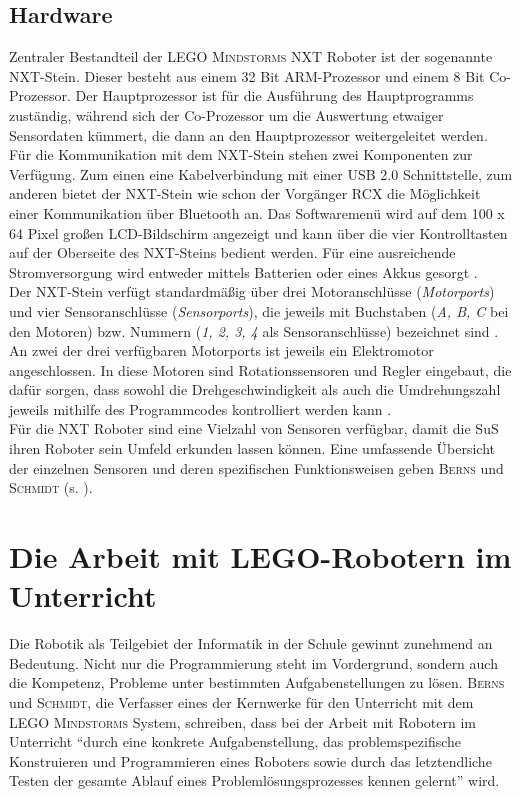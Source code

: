 \documentclass[paper=a4, pagesize, DIV=calc, BCOR=15.5mm, twoside=on, onecolumn=on, open = right, titlepage =on, parskip =half-, headsepline = on, footsepline = on, chapterprefix = on, appendixprefix = off, fontsize = 12pt, numbers = noenddot, abstract = on]{scrbook}
\numberwithin{equation}{chapter}
\theoremstyle{definition}
\theoremstyle{plain}
\theoremstyle{plain}
\theoremstyle{remark}
\theoremstyle{plain}
\theoremstyle{plain}
\begin{document}
\par \singlespacing
\subsection{Hardware}
\onehalfspacing
Zentraler Bestandteil der \textsc{LEGO Mindstorms} NXT Roboter ist der sogenannte NXT-Stein. Dieser besteht aus einem 32 Bit ARM-Prozessor und einem 8 Bit Co-Prozessor. Der Hauptprozessor ist für die Ausführung des Hauptprogramms zuständig, während sich der Co-Prozessor um die Auswertung etwaiger Sensordaten kümmert, die dann an den Hauptprozessor weitergeleitet werden. Für die Kommunikation mit dem NXT-Stein stehen zwei Komponenten zur Verfügung. Zum einen eine Kabelverbindung mit einer USB 2.0 Schnittstelle, zum anderen bietet der NXT-Stein wie schon der Vorgänger RCX die Möglichkeit einer Kommunikation über Bluetooth an. Das Softwaremenü wird auf dem 100 x 64 Pixel großen LCD-Bildschirm angezeigt und kann über die vier Kontrolltasten auf der Oberseite des NXT-Steins bedient werden. Für eine ausreichende Stromversorgung wird entweder mittels Batterien oder eines Akkus gesorgt \cite[S.42]{berns:10}.\\
Der NXT-Stein verfügt standardmäßig über drei Motoranschlüsse (\emph{Motorports}) und vier Sensoranschlüsse (\emph{Sensorports}), die jeweils mit Buchstaben (\emph{A, B, C} bei den Motoren) bzw. Nummern (\emph{1, 2, 3, 4} als Sensoranschlüsse) bezeichnet sind \cite[S.43]{berns:10}. An zwei der drei verfügbaren Motorports ist jeweils ein Elektromotor angeschlossen. In diese Motoren sind Rotationssensoren und Regler eingebaut, die dafür sorgen, dass sowohl die Drehgeschwindigkeit als auch die Umdrehungszahl jeweils mithilfe des Programmcodes kontrolliert werden kann \cite[S.45--47]{berns:10}.\\
Für die NXT Roboter sind eine Vielzahl von Sensoren verfügbar, damit die SuS ihren Roboter sein Umfeld erkunden lassen können. Eine umfassende Übersicht der einzelnen Sensoren und deren spezifischen Funktionsweisen geben \textsc{Berns} und \textsc{Schmidt} (s. \cite[Kapitel 4.2]{berns:10}). 

\par \singlespacing
 \section{Die Arbeit mit LEGO-Robotern im Unterricht}
\onehalfspacing
Die Robotik als Teilgebiet der Informatik in der Schule gewinnt zunehmend an Bedeutung. Nicht nur die Programmierung steht im Vordergrund, sondern auch die Kompetenz, Probleme unter bestimmten Aufgabenstellungen zu lösen. \textsc{Berns} und \textsc{Schmidt}, die Verfasser eines der Kernwerke für den Unterricht mit dem \textsc{LEGO Mindstorms} System, schreiben, dass bei der Arbeit mit Robotern im Unterricht "`durch eine konkrete Aufgabenstellung, das problemspezifische Konstruieren und Programmieren eines Roboters sowie durch das letztendliche Testen der gesamte Ablauf eines Problemlösungsprozesses kennen gelernt"' \cite[S.2]{berns:10} wird.
\end{document}
